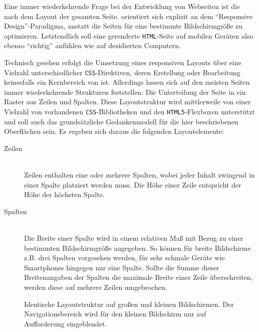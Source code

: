 Eine immer wiederkehrende Frage bei der Entwicklung von Webseiten ist die nach dem Layout der gesamten Seite. \idename{} orientiert sich explizit an dem "`Responsive Design"'-Paradigma, anstatt die Seiten für eine bestimmte Bildschirmgröße zu optimieren. Letztendlich soll eine gerenderte \texttt{HTML}-Seite auf mobilen Geräten also ebenso "`richtig"' anfühlen wie auf dezidierten Computern.

Technisch gesehen erfolgt die Umsetzung eines responsiven Layouts über eine Vielzahl unterschiedlicher \texttt{CSS}-Direktiven, deren Erstellung oder Bearbeitung keinesfalls ein Kernbereich von \idename{} ist. Allerdings lassen sich auf den meisten Seiten immer wiederkehrende Strukturen feststellen: Die Unterteilung der Seite in ein Raster aus Zeilen und Spalten. Diese Layoutstruktur wird mittlerweile von einer Vielzahl von vorhandenen \texttt{CSS}-Bib\-lio\-the\-ken und den \texttt{HTML5}-Flex\-boxen unterstützt und soll auch das grundsätzliche Gedankenmodell für die hier beschriebenen Oberflächen sein. Es ergeben sich daraus die folgenden Layoutelemente:

\begin{description}
\item[Zeilen] \hfill \\
  Zeilen enthalten eine oder mehrere Spalten, wobei jeder Inhalt zwingend in einer Spalte platziert werden muss. Die Höhe einer Zeile entspricht der Höhe der höchsten Spalte.
\item[Spalten] \hfill \\
  Die Breite einer Spalte wird in einem relativen Maß mit Bezug zu einer bestimmten Bildschirmgröße angegeben. So können für breite Bildschirme z.B. drei Spalten vorgesehen werden, für sehr schmale Geräte wie Smartphones hingegen nur eine Spalte. Sollte die Summe dieser Breitenangaben der Spalten die maximale Breite einer Zeile überschreiten, werden diese auf mehrere Zeilen umgebrochen.
\end{description}

\begin{figure}[h]
  \begin{center}
  \end{center}
  \caption{Identische Layoutstruktur auf großen und kleinen Bildschirmen. Der Navigationsbereich wird für den kleinen Bildschirm nur auf Aufforderung eingeblendet.}
  \label{fig:grid-example}
\end{figure}

